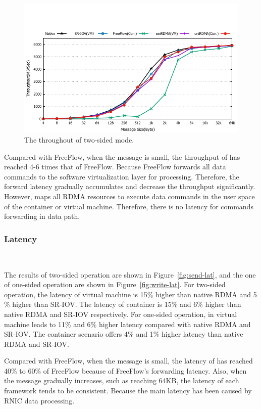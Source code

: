 \begin{figure}[!ht]
	\centering
	\includegraphics[width=1.0\linewidth]{images/send-bw.pdf}
	\caption{The throughout of two-sided mode.}
	\label{fig:send-bw}
\end{figure}

Compared with FreeFlow, when the message is small, the throughput of \sys has reached 4-6 times that of FreeFlow. Because FreeFlow forwards all data commands to the software virtualization layer for processing. Therefore, the forward latency gradually accumulates and decrease the throughput significantly. However, \sys maps all RDMA resources to execute data commands in the user space of the container or virtual machine. Therefore, there is no latency for commands forwarding in data path.





\subsubsection{\textbf{Latency}}
\
\noindent

The results of two-sided operation are shown in Figure~\ref{fig:send-lat}, and the one of one-sided operation are shown in Figure~\ref{fig:write-lat}. For two-sided operation, the latency of virtual machine is 15$\%$ higher than native RDMA and 5$\%$ higher than SR-IOV. The latency of container is 15$\%$ and 6$\%$ higher than native RDMA and SR-IOV respectively. For one-sided operation, \sys in virtual machine leads to 11$\%$ and 6$\%$ higher latency compared with native RDMA and SR-IOV. The container scenario offers 4$\%$ and 1$\%$ higher latency than native RDMA and SR-IOV. 

Compared with FreeFlow, when the message is small, the latency of \sys has reached 40\% to 60\% of FreeFlow because of FreeFlow's forwarding latency. Also, when the message gradually increases, such as reaching 64KB, the latency of each framework tends to be consistent. Because the main latency has been caused by RNIC data processing.

